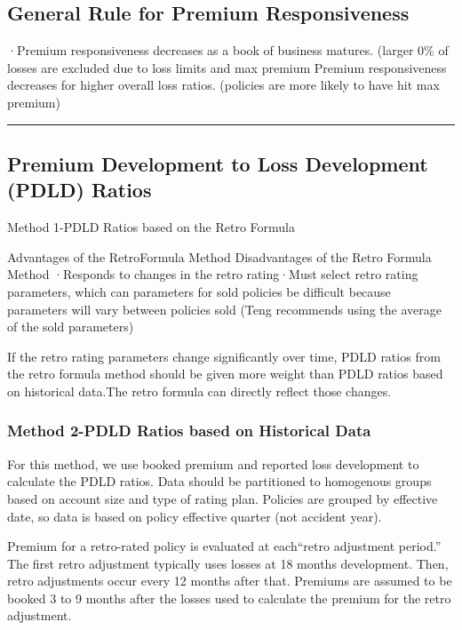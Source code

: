 \documentclass[
]{article}
\begin{document}
\subsection{General Rule for Premium
Responsiveness}\label{general-rule-for-premium-responsiveness}

·Premium responsiveness decreases as a book of business matures. (larger
\(0\%\) of losses are excluded due to loss limits and max premium
Premium responsiveness decreases for higher overall loss ratios.
(policies are more likely to have hit max premium)

\begin{center}\rule{0.5\linewidth}{0.5pt}\end{center}

\subsection{Premium Development to Loss Development (PDLD)
Ratios}\label{premium-development-to-loss-development-pdld-ratios}

Method 1-PDLD Ratios based on the Retro Formula

Advantages of the RetroFormula Method Disadvantages of the Retro Formula
Method ·Responds to changes in the retro rating·Must select retro rating
parameters, which can parameters for sold policies be difficult because
parameters will vary between policies sold (Teng recommends using the
average of the sold parameters)

If the retro rating parameters change significantly over time, PDLD
ratios from the retro formula method should be given more weight than
PDLD ratios based on historical data.The retro formula can directly
reflect those changes.

\subsubsection{Method 2-PDLD Ratios based on Historical
Data}\label{method-2-pdld-ratios-based-on-historical-data}

For this method, we use booked premium and reported loss development to
calculate the PDLD ratios. Data should be partitioned to homogenous
groups based on account size and type of rating plan. Policies are
grouped by effective date, so data is based on policy effective quarter
(not accident year).

Premium for a retro-rated policy is evaluated at each``retro adjustment
period.'' The first retro adjustment typically uses losses at 18 months
development. Then, retro adjustments occur every 12 months after that.
Premiums are assumed to be booked 3 to 9 months after the losses used to
calculate the premium for the retro adjustment.
\end{document}
